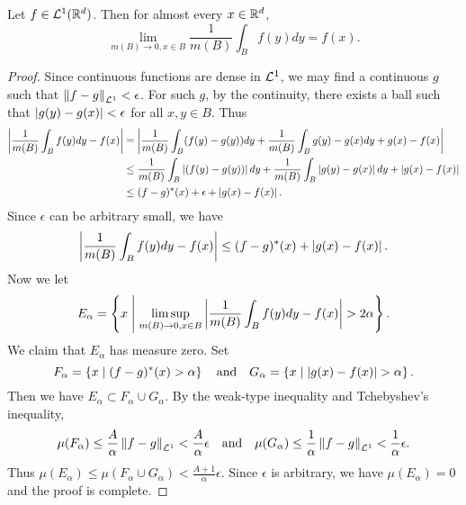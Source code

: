 \begin{theorem}
    Let $f\in\mathcal{L}^1(\mathbb{R}^d)$. Then for almost every $x\in\mathbb{R}^d$, 
    \begin{equation*}
        \lim_{m(B)\to 0, x\in B} \frac{1}{m(B)}\int_B f(y)dy = f(x).
    \end{equation*}
\end{theorem}
\begin{proof}
    Since continuous functions are dense in $\mathcal{L}^1$, we may find 
    a continuous $g$ such that $\left\lVert {f-g} \right\rVert_{\mathcal{L}^1}<\epsilon$. For 
    such $g$, by the continuity, there exists a ball such that 
    $\left\lvert {g(y)-g(x)} \right\rvert<\epsilon$ for all $x,y\in B$. Thus 
    \begin{equation*}
        \begin{split}
            \left\lvert {\frac{1}{m(B)}\int_B f(y)dy - f(x)} \right\rvert 
            &= \left\lvert {\frac{1}{m(B)}\int_B (f(y)-g(y))dy + \frac{1}{m(B)}\int_B g(y)- g(x)dy + g(x) - f(x)} \right\rvert \\ 
            &\leq \frac{1}{m(B)}\int_B \left\lvert {(f(y)-g(y))} \right\rvert dy + \frac{1}{m(B)}\int_B \left\lvert {g(y)- g(x)} \right\rvert dy + \left\lvert {g(x) - f(x)} \right\rvert \\ 
            &\leq (f-g)^*(x) + \epsilon + \left\lvert {g(x) - f(x)} \right\rvert.
        \end{split}
    \end{equation*}
    Since $\epsilon$ can be arbitrary small, we have 
    \begin{equation*}
        \left\lvert {\frac{1}{m(B)}\int_B f(y)dy - f(x)} \right\rvert \leq (f-g)^*(x) + \left\lvert {g(x) - f(x)} \right\rvert.
    \end{equation*}
    Now we let 
    \begin{equation*}
        E_\alpha = \left\{ x \;\middle\vert\; \limsup_{m(B)\to 0, x\in B} \left\lvert {\frac{1}{m(B)}\int_B f(y)dy-f(x)} \right\rvert > 2\alpha \right\}.
    \end{equation*}
    We claim that $E_\alpha$ has measure zero. Set 
    \begin{equation*}
        F_\alpha = \left\{ x \;\middle\vert\; (f-g)^*(x)>\alpha \right\} 
        \quad\text{and}\quad 
        G_\alpha = \left\{ x \;\middle\vert\; \left\lvert {g(x)-f(x)} \right\rvert>\alpha \right\}.
    \end{equation*}
    Then we have $E_\alpha\subset F_\alpha\cup G_\alpha$. By the 
    weak-type inequality and Tchebyshev's inequality, 
    \begin{equation*}
        \mu(F_\alpha) \leq \frac{A}{\alpha}\left\lVert {f-g} \right\rVert_{\mathcal{L}^1}<\frac{A}{\alpha}\epsilon
        \quad\text{and}\quad
        \mu(G_\alpha) \leq \frac{1}{\alpha}\left\lVert {f-g} \right\rVert_{\mathcal{L}^1}<\frac{1}{\alpha}\epsilon.
    \end{equation*}
    Thus $\mu(E_\alpha)\leq \mu(F_\alpha\cup G_\alpha)<\frac{A+1}{\alpha}\epsilon$. 
    Since $\epsilon$ is arbitrary, we have $\mu(E_\alpha)=0$ and 
    the proof is complete.
\end{proof}
